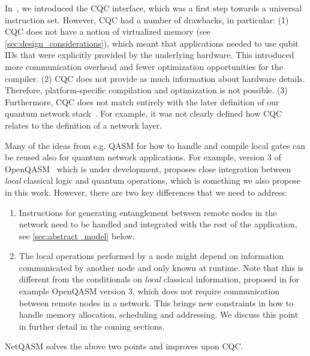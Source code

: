 In~\cite{dahlberg2018simulaqron}, we introduced the \ac{CQC} interface, which was a first step towards a universal instruction set.
However, \ac{CQC} had a number of drawbacks, in particular:
    (1) \ac{CQC} does not have a notion of virtualized memory (see \cref{sec:design_considerations}), which meant that applications needed to use qubit IDs that were explicitly provided by the underlying hardware.
        This introduced more communication overhead and fewer optimization opportunities for the compiler.
    (2) \ac{CQC} does not provide as much information about hardware details.
        Therefore, platform-specific compilation and optimization is not possible.
    (3) Furthermore, \ac{CQC} does not match entirely with the later definition of our quantum network stack~\cite{dahlberg2019linklayer, kozlowski2020networklayer}.
        For example, it was not clearly defined how \ac{CQC} relates to the definition of a network layer.

Many of the ideas from e.g. QASM for how to handle and compile local gates can be reused also for quantum network applications.
For example, version 3 of OpenQASM~\cite{cross2021openqasm} which is under development, proposes close integration between \emph{local} classical logic and quantum operations, which is something we also propose in this work.
However, there are two key differences that we need to address:
\begin{enumerate}
      \item Instructions for generating entanglement between remote nodes in the network need to be handled and integrated with the rest of the application, see \cref{sec:abstract_model} below.
      \item The local operations performed by a node might depend on information communicated by another node and only known at runtime.
            Note that this is different from the conditionals on \emph{local} classical information, proposed in for example OpenQASM version 3, which does not require communication between remote nodes in a network.
            This brings new constraints in how to handle memory allocation, scheduling and addressing.
            We discuss this point in further detail in the coming sections.
\end{enumerate}
\ac{NetQASM} solves the above two points and improves upon \ac{CQC}.


